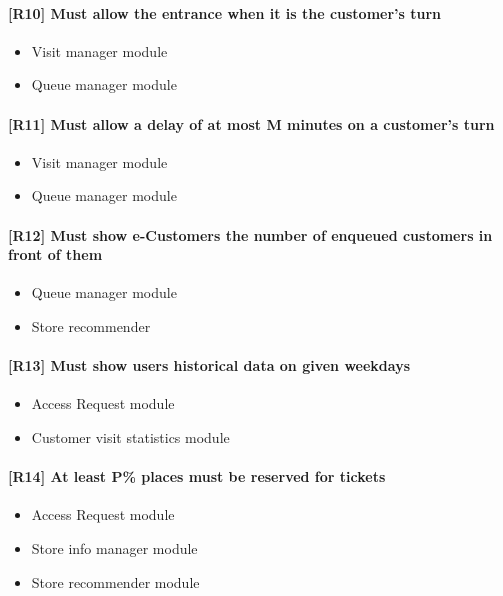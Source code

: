 \paragraph{[R10] Must allow the entrance when it is the customer’s turn}
\begin{itemize}[itemsep=-1mm, topsep=-1mm]
	\item Visit manager module
	\item Queue manager module
\end{itemize}

\paragraph{[R11] Must allow a delay of at most M minutes on a customer’s turn}
\begin{itemize}[itemsep=-1mm, topsep=-1mm]
	\item Visit manager module
	\item Queue manager module
\end{itemize}

\paragraph{[R12] Must show e-Customers the number of enqueued customers in front of them}
\begin{itemize}[itemsep=-1mm, topsep=-1mm]
	\item Queue manager module
	\item Store recommender 
\end{itemize}

\paragraph{[R13] Must show users historical data on given weekdays}
\begin{itemize}[itemsep=-1mm, topsep=-1mm]
	\item Access Request module
	\item Customer visit statistics module
\end{itemize}

\paragraph{[R14] At least P\% places must be reserved for tickets}
\begin{itemize}[itemsep=-1mm, topsep=-1mm]
	\item Access Request module
	\item Store info manager module
	\item Store recommender module
\end{itemize}

